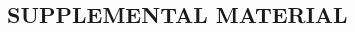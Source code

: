 \documentclass[11pt, titlepage]{article}\usepackage[]{graphicx}\usepackage[]{color}
\renewcommand{\theequation}{eqn \arabic{equation}}
\begin{document}
\begin{spacing}{1.9}
\setlength{\parindent}{1cm}



\clearpage
\setcounter{equation}{0}
\renewcommand{\theequation}{eqn S.\arabic{equation}}
\setcounter{figure}{0}
\renewcommand{\thefigure}{S\arabic{figure}}
\section*{SUPPLEMENTAL MATERIAL}




\end{spacing}
\end{document}
